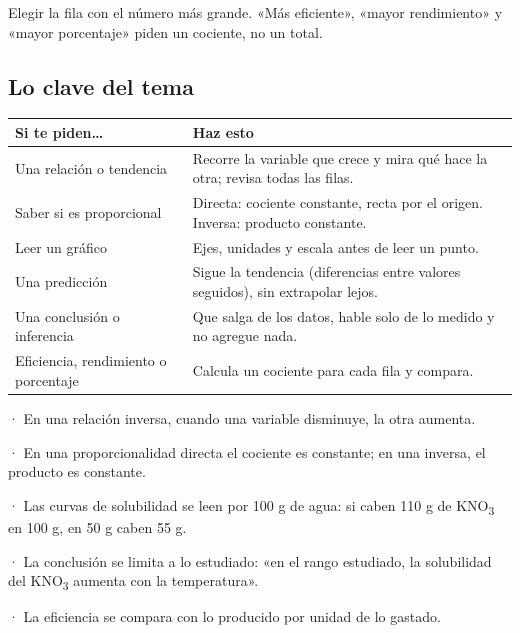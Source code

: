  
\begin{ojo} Elegir la fila con el número más grande. «Más eficiente», «mayor rendimiento» y «mayor porcentaje» piden un cociente, no un total.\end{ojo}
\subsection{Lo clave del tema}
\begin{center}\small
\begin{tabularx}{\linewidth}{@{}>{\raggedright\arraybackslash\hsize=0.95\hsize}X>{\raggedright\arraybackslash\hsize=1.05\hsize}X@{}}
\toprule
\textbf{Si te piden\dots{}} & \textbf{Haz esto} \\
\midrule
Una relación o tendencia & Recorre la variable que crece y mira qué hace la otra; revisa todas las filas. \\
Saber si es proporcional & Directa: cociente constante, recta por el origen. Inversa: producto constante. \\
Leer un gráfico & Ejes, unidades y escala antes de leer un punto. \\
Una predicción & Sigue la tendencia (diferencias entre valores seguidos), sin extrapolar lejos. \\
Una conclusión o inferencia & Que salga de los datos, hable solo de lo medido y no agregue nada. \\
Eficiencia, rendimiento o porcentaje & Calcula un cociente para cada fila y compara. \\
\bottomrule
\end{tabularx}
\end{center}
 
\begin{clave}[{Recuerda}] · En una relación inversa, cuando una variable disminuye, la otra aumenta.\par · En una proporcionalidad directa el cociente es constante; en una inversa, el producto es constante.\par · Las curvas de solubilidad se leen por 100 g de agua: si caben 110 g de KNO\textsubscript{3} en 100 g, en 50 g caben 55 g.\par · La conclusión se limita a lo estudiado: «en el rango estudiado, la solubilidad del KNO\textsubscript{3} aumenta con la temperatura».\par · La eficiencia se compara con lo producido por unidad de lo gastado.\end{clave}
 
